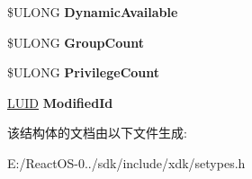 \begin{DoxyCompactItemize}
\$U\+L\+O\+NG {\bfseries Dynamic\+Available}
\item 
\mbox{\label{struct___t_o_k_e_n___s_t_a_t_i_s_t_i_c_s_af1696acd83bd6225f249abb29f96b13a}} 
\$U\+L\+O\+NG {\bfseries Group\+Count}
\item 
\mbox{\label{struct___t_o_k_e_n___s_t_a_t_i_s_t_i_c_s_ad12f4ad1a426dad0156a0bfc66d67de7}} 
\$U\+L\+O\+NG {\bfseries Privilege\+Count}
\item 
\mbox{\label{struct___t_o_k_e_n___s_t_a_t_i_s_t_i_c_s_a6274608cdd8600e598e00dff256b3b3a}} 
\hyperlink{struct___l_u_i_d}{L\+U\+ID} {\bfseries Modified\+Id}
\end{DoxyCompactItemize}


该结构体的文档由以下文件生成\+:\begin{DoxyCompactItemize}
\item 
E\+:/\+React\+O\+S-\/0../sdk/include/xdk/setypes.\+h\end{DoxyCompactItemize}
